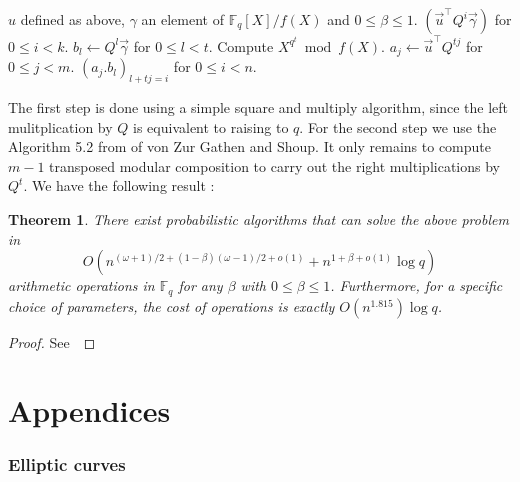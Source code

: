 \documentclass[12pt]{article}
\theoremstyle{plain}
\newtheorem{theorem}{Theorem}
\theoremstyle{definition}
\newcommand{\todo}[1]{\textcolor{red}{TODO: #1}}
\DeclareMathOperator{\Aut}{Aut}
\def\F{\ensuremath{\mathbb{F}}}
\newcounter{algorithm}
\begin{document}
\begin{algorithm}
  \label{algorithm:autoproj}
  \begin{algorithmic}[1]
    \REQUIRE $u$ defined as above, $\gamma$ an element of $\F_q[X]/f(X)$ and 
$0\leq\beta\leq1$.
    \ENSURE $(\vec{u}^\top Q^i\vec{\gamma})$ for $0\leq i<k$.
    \STATE $b_l\leftarrow Q^l\vec{\gamma}$ for $0\leq l<t$.
    \STATE Compute $X^{q^t}\bmod f(X)$.
    \STATE $a_j\leftarrow\vec{u}^\top Q^{tj}$ for $0\leq j<m$.
    \RETURN $(a_j.b_l)_{l+tj=i}$ for $0\leq i<n$.
  \end{algorithmic}
\end{algorithm}

The first step is done using a simple square and multiply algorithm, since
the left mulitplication by $Q$ is equivalent to raising to $q$. For the second 
step we use the Algorithm 5.2 from \cite{} of von Zur Gathen and Shoup. It only 
remains to compute $m-1$ transposed modular composition to carry out the right 
multiplications by $Q^t$. We have the following result :

\begin{theorem}
There exist probabilistic algorithms that can solve the above problem in 
\begin{equation}
O(n^{(\omega+1)/2+(1-\beta)(\omega-1)/2+o(1)}+n^{1+\beta+o(1)}\log{q})
\end{equation}
arithmetic operations in $\F_q$ for any $\beta$ with $0\leq\beta\leq1$.
Furthermore, for a specific choice of parameters, the cost of operations is
exactly $O(n^{1.815})\log{q}$.
\end{theorem}

\begin{proof}
See~\cite[Theorem 6]{}
\end{proof}



\appendix
\part*{Appendices}


\section{Elliptic curves}
\label{app:elliptic-curves}


\end{document}
